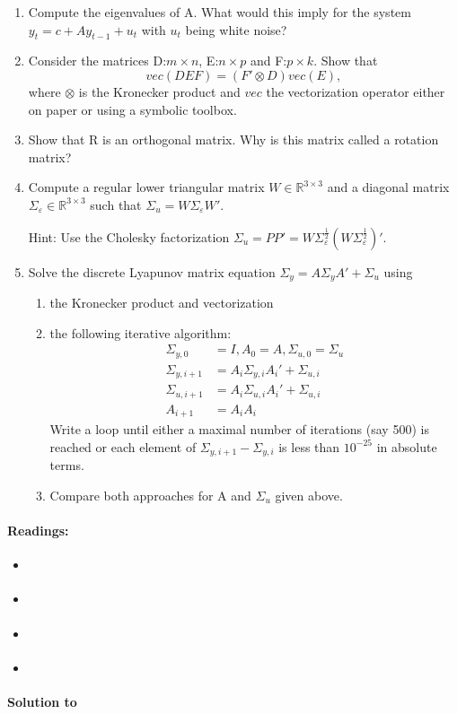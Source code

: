 \begin{enumerate}

\item Compute the eigenvalues of A.
What would this imply for the system \(y_t = c + A y_{t-1} + u_t\) with \(u_t\) being white noise?

\item Consider the matrices D:\@ \(m\times n\), E:\@ \(n\times p\) and F:\@ \(p\times k\).
Show that
\[vec(DEF)=\left(F'\otimes D\right) vec(E),\]
where \(\otimes \) is the Kronecker product and \(vec\) the vectorization operator
either on paper or using a symbolic toolbox.

\item Show that R is an orthogonal matrix. Why is this matrix called a rotation matrix?	

\item Compute a regular lower triangular matrix \(W \in \mathbb{R}^{3 \times 3}\)
and a diagonal matrix \(\Sigma_\varepsilon \in \mathbb{R}^{3 \times 3}\)
such that \(\Sigma_u=W \Sigma_\varepsilon W'\).

Hint: Use the Cholesky factorization \(\Sigma_u = P P' = W \Sigma_\varepsilon^{\frac{1}{2}}(W \Sigma_\varepsilon^{\frac{1}{2}})'\).

\item Solve the discrete Lyapunov matrix equation \(\Sigma_{y} = A\Sigma_{y}A' + \Sigma_{u}\) using
	\begin{enumerate}
	\item the Kronecker product and vectorization
	\item the following iterative algorithm:
	\begin{align*}
	\Sigma_{y,0} &= I, A_0 = A, \Sigma_{u,0} = \Sigma_{u}\\
	\Sigma_{y,i+1} &= A_i \Sigma_{y,i} A_i' + \Sigma_{u,i}\\
	\Sigma_{u,i+1} &= A_i \Sigma_{u,i} A_i' + \Sigma_{u,i}\\
	A_{i+1} &= A_i A_i
	\end{align*}
	Write a loop until either a maximal number of iterations (say 500) is reached
	  or each element of \(\Sigma_{y,i+1}-\Sigma_{y,i}\) is less than \(10^{-25}\) in absolute terms.
	\item Compare both approaches for A and \(\Sigma_u\) given above.
	\end{enumerate}
\end{enumerate}

\paragraph{Readings:}
\begin{itemize}	
\item \textcite[Ch.~4.2]{Anderson.McGrattan.Hansen.EtAl_1996_MechanicsFormingEstimating}
\item \textcite[Ch.~6.7]{Anderson.Moore_1979_OptimalFiltering}
\item \textcite[App.~A]{Lutkepohl_2005_NewIntroductionMultiple}
\item \textcite[Ch.~4.10]{Uribe.Schmitt-Grohe_2017_OpenEconomyMacroeconomics}
\end{itemize}

\begin{solution}\textbf{Solution to }
\ifDisplaySolutions%

\fi
\newpage
\end{solution}